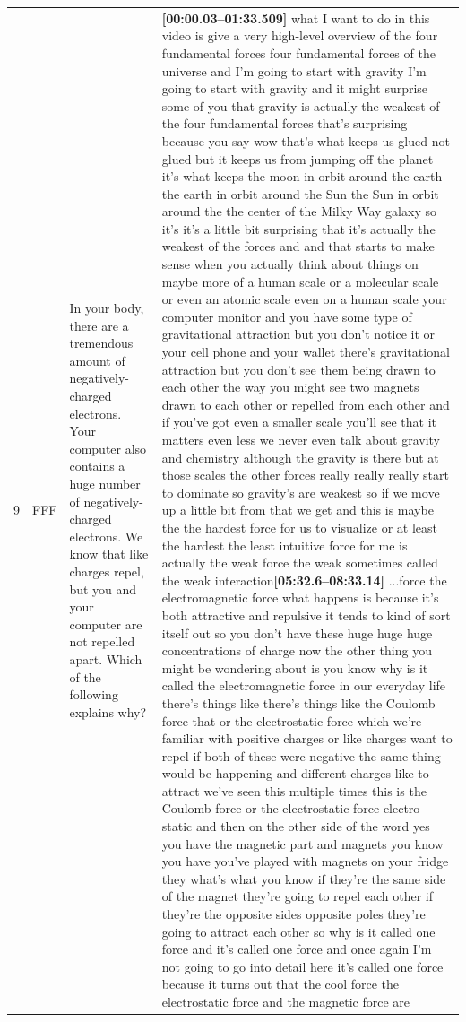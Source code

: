 \documentclass[10pt]{article}
\begin{document}
\begin{tiny}
\begin{longtable}{|r|p{0.375in}|p{1.275in}|p{3.5in}|}
9  &          FFF &  In your body, there are a tremendous amount of negatively-charged electrons. Your computer also contains a huge number of negatively-charged electrons. We know that like charges repel, but you and your computer are not repelled apart. Which of the following explains why? &  \textbf{[00:00.03--01:33.509]} what I want to do in this video is give a very high-level overview of the four fundamental forces four fundamental forces of the universe and I'm going to start with gravity I'm going to start with gravity and it might surprise some of you that gravity is actually the weakest of the four fundamental forces that's surprising because you say wow that's what keeps us glued not glued but it keeps us from jumping off the planet it's what keeps the moon in orbit around the earth the earth in orbit around the Sun the Sun in orbit around the the center of the Milky Way galaxy so it's it's a little bit surprising that it's actually the weakest of the forces and and that starts to make sense when you actually think about things on maybe more of a human scale or a molecular scale or even an atomic scale even on a human scale your computer monitor and you have some type of gravitational attraction but you don't notice it or your cell phone and your wallet there's gravitational attraction but you don't see them being drawn to each other the way you might see two magnets drawn to each other or repelled from each other and if you've got even a smaller scale you'll see that it matters even less we never even talk about gravity and chemistry although the gravity is there but at those scales the other forces really really really start to dominate so gravity's are weakest so if we move up a little bit from that we get and this is maybe the the hardest force for us to visualize or at least the hardest the least intuitive force for me is actually the weak force the weak sometimes called the weak interaction\newline\textbf{[05:32.6--08:33.14]} ...force the electromagnetic force what happens is because it's both attractive and repulsive it tends to kind of sort itself out so you don't have these huge huge huge concentrations of charge now the other thing you might be wondering about is you know why is it called the electromagnetic force in our everyday life there's things like there's things like the Coulomb force that or the electrostatic force which we're familiar with positive charges or like charges want to repel if both of these were negative the same thing would be happening and different charges like to attract we've seen this multiple times this is the Coulomb force or the electrostatic force electro static and then on the other side of the word yes you have the magnetic part and magnets you know you have you've played with magnets on your fridge they what's what you know if they're the same side of the magnet they're going to repel each other if they're the opposite sides opposite poles they're going to attract each other so why is it called one force and it's called one force and once again I'm not going to go into detail here it's called one force because it turns out that the cool force the electrostatic force and the magnetic force are 
\end{longtable}
\end{tiny}
\end{document}
